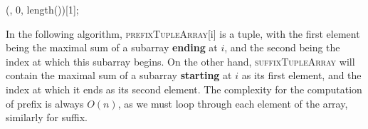\documentclass[12pt]{article}
\theoremstyle{definition}
\theoremstyle{remark}
\begin{document}
\begin{enumerate}
\begin{algorithm}
    \BlankLine
\BlankLine 
  \Return \maxsubarray (\arr, 0, length(\arr))[1];\\

\end{algorithm}
\DecMargin{1em}



In the following algorithm, \textsc{prefixTupleArray}[i] is a tuple, with the first element being the maximal sum of a subarray \textbf{ending} at $i$, and the second being the index at which this subarray begins. On the other hand, \textsc{suffixTupleArray} will contain the maximal sum of a subarray \textbf{starting} at $i$ as its first element, and the index at which it ends as its second element. The complexity for the computation of prefix is always $O(n)$, as we must loop through each element of the array, similarly for suffix. 


\end{enumerate}
\end{document}
